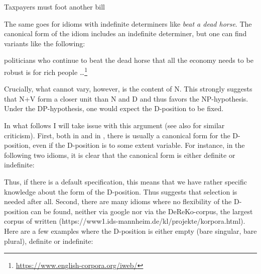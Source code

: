 \documentclass[output=paper,colorlinks,citecolor=black,
]{langscibook}
\begin{document}
\largerpage
 \ea Taxpayers must foot another bill
 \z
 
\noindent
 The same goes for idioms with indefinite determiners like \emph{beat a dead horse}. The canonical form of the idiom includes an indefinite determiner, but one can find variants like the following:
 
 \ea politicians who continue to beat the dead horse that all the economy needs to be robust is for rich people \ldots\footnote{
\url{https://www.english-corpora.org/iweb/}}
 \z

\noindent
Crucially, what cannot vary, however, is the content of N. This strongly suggests that N+V form a closer unit than N and D and thus favors the NP-hypothesis. Under the DP-hypothesis, one would expect the D-position to be fixed.
 
 In what follows I will take issue with this argument (see also \citealt{Larson:to-appear:DP-hypothesisDP-CP} for similar criticism). First, both in  and in , there is usually a canonical form for the D-position, even if the D-position is to some extent variable. For instance, in the following two  idioms, it is clear that the canonical form is either definite or indefinite:

 \ea
    \z
    \z
    
\noindent
Thus, if there is a default specification, this means that   we have rather specific knowledge about the form of the D-position. Thus suggests that selection is needed after all. Second, there are many idioms where no flexibility of the D-position can be found, neither via google nor via the DeReKo-corpus, the largest corpus of written  (https://www1.ids-mannheim.de/kl/projekte/korpora.html). Here are a few  examples where the D-position is either empty (bare singular, bare plural), definite or indefinite:
    
    \ea
    \z
    \z
   
\end{document}
